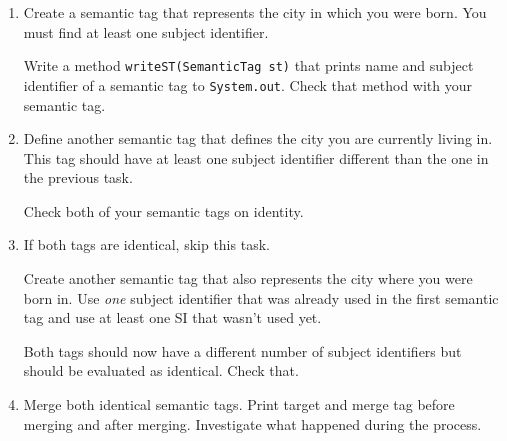 \begin{enumerate}
    \item
Create a semantic tag that represents the city in which you were born. You must find at least one subject identifier.

Write a method {\tt writeST(SemanticTag st)} that prints name and subject identifier of a semantic tag to {\tt System.out}. Check that method with your semantic tag.

\item
Define another semantic tag that defines the city you are currently living in. This tag should have at least one subject identifier different than the one in the previous task.

Check both of your semantic tags on identity.

\item
If both tags are identical, skip this task.

Create another semantic tag that also represents the city where you were born in. Use {\it one} subject identifier that was already used in the first semantic tag and use at least one SI that wasn't used yet.

Both tags should now have a different number of subject identifiers but should be evaluated as identical. Check that.

\item
Merge both identical semantic tags. Print target and merge tag before merging and after merging. Investigate what happened during the process.

\end{enumerate}
